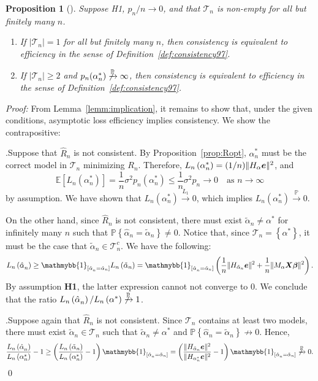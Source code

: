\documentclass[11pt, letter paper]{article}
\newcommand{\1}{\mathmybb{1}}
\newtheorem{proposition}{Proposition}[section]
\newcommand{\0}{\emptyset}
\newcommand{\prob}{\mathbb{P}}
\newcommand{\Ep}[1]{\mathbb{E}\left[ #1 \right]}
\newcommand{\paren}[1]{\left(#1 \right)}
\newcommand{\sqbr}[1]{\left[#1 \right]}
\newcommand{\set}[1]{\left\{ #1 \right\}}
\newcommand{\norm}[1]{|\hspace{-1pt}|#1 |\hspace{-1pt}|}
\newcommand{\normsq}[1]{\norm{#1}^{2}}
\newcommand{\ind}[1]{\mathmybb{1}_{\sqbr{#1}}}
\newcommand{\Tcal}{\mathcal{T}_{n}}
\newcommand{\X}{\boldsymbol{X}}
\newcommand{\e}{\boldsymbol{e}}
\newcommand{\bbeta}{\boldsymbol{\beta}}
\newcommand{\Loss}[1]{L_{n}\paren{#1}}
\newcommand{\alphahat}[1]{\hat{\alpha}^{#1}}
\newcommand{\alphatilde}{\tilde{\alpha}}
\begin{document}
\begin{proposition}[\cite{shao_1997}]\label{prop:equiv}
    Suppose H1, \(p_{n}/n\to 0\), and that \(\Tcal\) is non-empty for all but finitely many \(n\).
    \begin{enumerate}
        \item If \(|\Tcal|=1\) for all but finitely many \(n\), then consistency is equivalent to efficiency in the sense of Definition~\ref{def:consistency97}.
        \item If \(|\Tcal|\geq 2\) and \(p_{n}(\alpha^{*}_{n})\not\xrightarrow{\prob}\infty\), then consistency is equivalent to efficiency in the sense of Definition~\ref{def:consistency97}.
    \end{enumerate}
\end{proposition}
\begin{myproofbox}
    \textit{Proof: }
    From Lemma~\ref{lemm:implication}, it remains to show that, under the given conditions, asymptotic loss efficiency implies consistency. We show the contrapositive:

    .\quad Suppose that \(\hat{R}_{n}\) is not consistent. By Proposition~\ref{prop:Ropt}, \(\alpha^{*}_{n}\) must be the correct model in \(\Tcal\) minimizing \(R_{n}\). Therefore, \(\Loss{\alpha^{*}_{n}} = (1/n)\normsq{H_{\alpha}\e}\), and
    \[\Ep{\Loss{\alpha^{*}_{n}}} = \frac{1}{n}\sigma^{2}p_{n}(\alpha^{*}_{n})\leq \frac{1}{n}\sigma^{2}p_{n}\to 0 \quad\text{as }n\to\infty\]
    by assumption. We have shown that \(\Loss{\alpha^{*}_{n}}\xrightarrow{L_{1}} 0\), which implies \(\Loss{\alpha^{*}_{n}}\xrightarrow{\prob} 0\).

    On the other hand, since \(\hat{R}_{n}\) is not consistent, there must exist \(\alphatilde_{n}\neq\alpha^{*}\) for infinitely many \(n\) such that \(\prob\set{\alphahat{}_{n} = \alphatilde_{n}} \neq 0\). Notice that, since \(\Tcal=\set{\alpha^{*}}\), it must be the case that \(\alphatilde_{n}\in\Tcal^{c}\). We have the following:
    \[\Loss{\alphahat{}_{n}}\geq \ind{\alphahat{}_{n} = \alphatilde_{n}}\Loss{\alphatilde_{n}} = \ind{\alphahat{}_{n} = \alphatilde_{n}}\paren{\frac{1}{n}\normsq{H_{\alphatilde_{n}}\e} + \frac{1}{n}\normsq{M_{\alpha}\X\bbeta}}.\]
    By assumption \textbf{H1}, the latter expression cannot not converge to 0. We conclude that the ratio \(\Loss{\alphahat{}_{n}}/\Loss{\alpha^{*}}\not\xrightarrow{\prob} 1\).

    .\quad Suppose again that \(\hat{R}_{n}\) is not consistent. Since \(\Tcal\) contains at least two models, there must exist \(\alphatilde_{n}\in\Tcal\) such that \(\alphatilde_{n}\neq \alpha^{*}\) and \(\prob\set{\alphahat{}_{n} = \alphatilde_{n}}\not\to 0\). Hence,
    \[\frac{\Loss{\alphahat{}_{n}}}{\Loss{\alpha^{*}_{n}}} - 1 \geq \paren{\frac{\Loss{\alphatilde{}_{n}}}{\Loss{\alpha^{*}_{n}}} - 1}\ind{\alphahat{}_{n} = \alphatilde_{n}} = \paren{\frac{\normsq{H_{\alphatilde_{n}}\e}}{\normsq{H_{\alpha^{*}_{n}}\e}} - 1}\ind{\alphahat{}_{n} = \alphatilde_{n}}\not\xrightarrow{\prob}0.\]\qed{}
\end{myproofbox}
\end{document}
